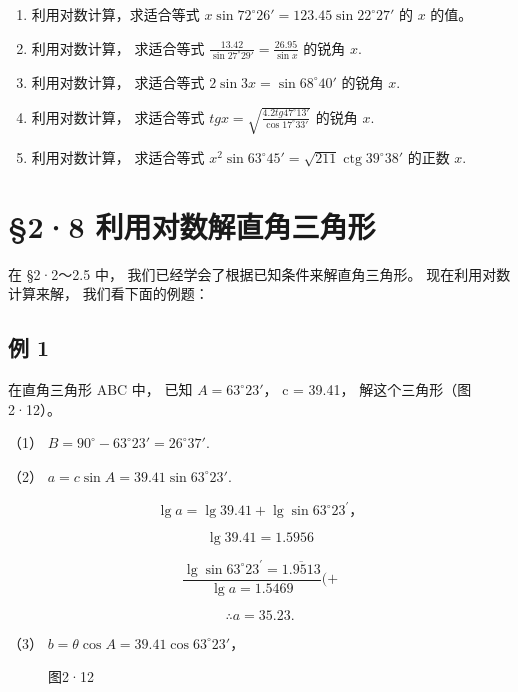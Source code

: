 \begin{enumerate}
\item
  利用对数计算，求适合等式
  \(x \sin 72^{\circ}26' = 123.45 \sin 22^{\circ}27'\) 的 \(x\) 的值。
\item
  利用对数计算， 求适合等式
  \(\frac{13.42}{\sin 27^{\circ}29'} = \frac{26.95}{\sin x}\) 的锐角
  \(x\).
\item
  利用对数计算， 求适合等式 \(2 \sin 3x = \sin 68^{\circ}40'\) 的锐角
  \(x\).
\item
  利用对数计算， 求适合等式
  \(tg x = \sqrt{\frac{4.2tg 47^{\circ}13'}{\cos 17^{\circ}33'}}\)
  的锐角 \(x\).
\item
  利用对数计算， 求适合等式
  \(x^{2} \sin 63^{\circ} 45' = \sqrt{211} \operatorname{ctg} 39^{\circ} 38'\)
  的正数 \(x\).
\end{enumerate}

\section{§2·8 利用对数解直角三角形}

在 §2·2～2.5 中，
我们已经学会了根据已知条件来解直角三角形。 现在利用对数计算来解，
我们看下面的例题：

\subsection{例 1}

在直角三角形 ABC 中， 已知 \(A = 63^{\circ}23'\)， c = 39.41，
解这个三角形（图2·12）。

 （1）
\(B = 90^{\circ} - 63^{\circ}23' = 26^{\circ}37'\).

（2） \(a = c\sin A = 39.41\sin 63^{\circ}23'\).

\[
\lg a = \lg 39.41 + \lg \sin 63 ^{\circ} 23 ^{\prime}\text{，}
\]

\[
\lg 39.41 = 1.5956
\]

\[
\frac {\lg \sin 63 ^{\circ} 23 ^{\prime} = \overline {{1.9513}}}{\lg a = 1.5469} (+ \tag {+}
\]

\[
\therefore a = 35.23.
\]

（3） \(b = \theta \cos A = 39.41 \cos 63^{\circ}23'\)，

\begin{figure}
\centering
{}
\caption{图2·12}
\end{figure}


